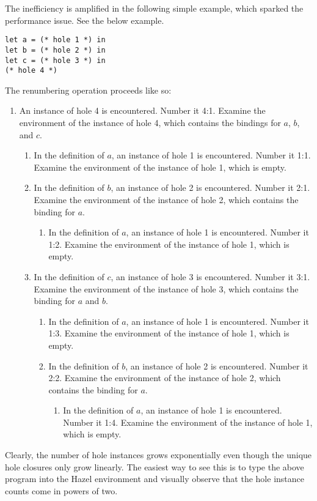 \documentclass{article}
\begin{document}
The inefficiency is amplified in the following simple example, which sparked the performance issue. See the below example.
\begin{verbatim}
let a = (* hole 1 *) in
let b = (* hole 2 *) in
let c = (* hole 3 *) in
(* hole 4 *)
\end{verbatim}
The renumbering operation proceeds like so:
\begin{enumerate}
\item An instance of hole 4 is encountered. Number it 4:1. Examine the environment of the instance of hole 4, which contains the bindings for $a$, $b$, and $c$.
  \begin{enumerate}
  \item In the definition of $a$, an instance of hole 1 is encountered. Number it 1:1. Examine the environment of the instance of hole 1, which is empty.
  \item In the definition of $b$, an instance of hole 2 is encountered. Number it 2:1. Examine the environment of the instance of hole 2, which contains the binding for $a$.
    \begin{enumerate}
    \item In the definition of $a$, an instance of hole 1 is encountered. Number it 1:2. Examine the environment of the instance of hole 1, which is empty.
    \end{enumerate}
  \item In the definition of $c$, an instance of hole 3 is encountered. Number it 3:1. Examine the environment of the instance of hole 3, which contains the binding for $a$ and $b$.
    \begin{enumerate}
    \item In the definition of $a$, an instance of hole 1 is encountered. Number it 1:3. Examine the environment of the instance of hole 1, which is empty.
    \item In the definition of $b$, an instance of hole 2 is encountered. Number it 2:2. Examine the environment of the instance of hole 2, which contains the binding for $a$.
      \begin{enumerate}
      \item In the definition of $a$, an instance of hole 1 is encountered. Number it 1:4. Examine the environment of the instance of hole 1, which is empty.
      \end{enumerate}
    \end{enumerate}
  \end{enumerate}
\end{enumerate}
Clearly, the number of hole instances grows exponentially even though the unique hole closures only grow linearly. The easiest way to see this is to type the above program into the Hazel environment and visually observe that the hole instance counts come in powers of two.
\end{document}
